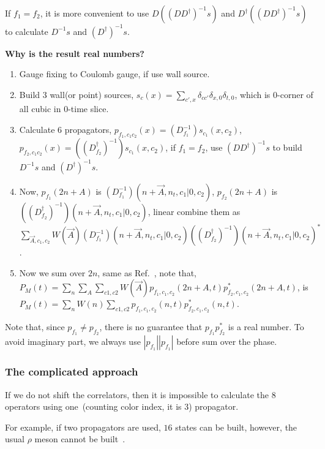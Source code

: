 If $f_1=f_2$, it is more convenient to use $D\left((DD^{\dagger})^{-1} s\right)$ and $D^{\dagger}\left((DD^{\dagger})^{-1} s\right)$ to calculate $D^{-1}s$ and $(D^{\dagger})^{-1}s$.

\textbf{\textcolor[rgb]{1,0,0}{Why is the result real numbers?}}

\begin{enumerate}
    \item Gauge fixing to Coulomb gauge, if use wall source.
    \item Build $3$ wall(or point) sources, $s_{c}(x) = \sum _{c', x}\delta _{cc'} \delta _{x,0} \delta _{t,0}$, which is $0$-corner of all cubic in $0$-time slice.
    \item Calculate $6$ propagators, $p_{f_1,c_1c_2}(x)=(D_{f_1}^{-1})s_{c_1}(x,c_2)$, $p_{f_2,c_1c_2}(x)=((D_{f_2}^{\dagger})^{-1})s_{c_1}(x,c_2)$, if $f_1=f_2$, use $(DD^{\dagger})^{-1} s$ to build $D^{-1}s$ and $(D^{\dagger})^{-1}s$.
    \item Now, $p_{f_1}(2n+A)$ is $\left(D_{f_1}^{-1}\right)\left(n+\vec{A},n_t,c_1|0,c_2\right)$, $p_{f_2}(2n+A)$ is $\left((D_{f_2}^{\dagger})^{-1}\right)\left(n+\vec{A},n_t,c_1|0,c_2\right)$, linear combine them as $\sum _{\vec{A},c_1,c_2}W(\vec{A}) \left(D_{f_1}^{-1}\right)\left(n+\vec{A},n_t,c_1|0,c_2\right)\left((D_{f_2}^{\dagger})^{-1}\right)\left(n+\vec{A},n_t,c_1|0,c_2\right)^*$.
    \item Now we sum over $2n$, same as Ref.~\cite{Gottlieb:1988gr}, note that, $P_M(t)=\sum _{n}\sum _A \sum _{c1,c2} W(\vec{A})p_{f_1,c_1,c_2}(2n+A,t)p^*_{f_2,c_1,c_2}(2n+A,t)$, is $P_M(t)=\sum _{n}W(n) \sum _{c1,c2} p_{f_1,c_1,c_2}(n,t)p^*_{f_2,c_1,c_2}(n,t)$.
\end{enumerate}

Note that, since $p_{f_1}\neq p_{f_2}$, there is no guarantee that $p_{f_1}p_{f_2}^*$ is a real number.
To avoid imaginary part, we always use $|p_{f_1}||p_{f_1}|$ before sum over the phase.

\subsubsection{\label{TheComplecateApproach}The complicated approach}

If we do not shift the correlators, then it is impossible to calculate the $8$ operators using one~(counting color index, it is 3) propagator.

For example, if two propagators are used, $16$ states can be built, however, the usual $\rho$ meson cannot be built~\cite{Gupta:1990mr}.

